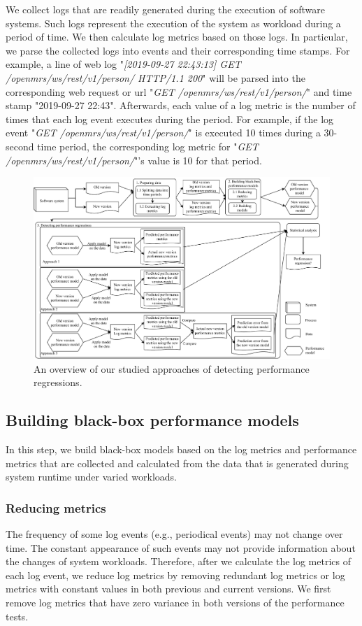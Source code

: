 We collect logs that are readily generated during the execution of software systems. Such logs represent the execution of the system as workload during a period of time. We then calculate log metrics based on those logs. In particular, we parse the collected logs into events and their corresponding time stamps. For example, a line of web log "\emph{[2019-09-27 22:43:13] GET /openmrs/ws/rest/v1/person/ HTTP/1.1 200}" will be parsed into the corresponding web request or url "\emph{GET /openmrs/ws/rest/v1/person/}" and time stamp "2019-09-27 22:43". Afterwards, each value of a log metric is the number of times that each log event executes during the period. For example, if the log event "\emph{GET /openmrs/ws/rest/v1/person/}" is executed 10 times during a 30-second time period, the corresponding log metric for "\emph{GET /openmrs/ws/rest/v1/person/}"’s value is 10 for that period. 


\begin{figure}[tbh]
  \centering
  \includegraphics[width=\textwidth]{overview.pdf}
  \caption{An overview of our studied approaches of detecting performance regressions.}
  \label{fig:overview}
\end{figure}



\subsection{Building black-box performance models}
\label{sec:buildmodel}
In this step, we build black-box models based on the log metrics and performance metrics that are collected and calculated from the data that is generated during system runtime under varied workloads. 

\subsubsection{Reducing metrics}
The frequency of some log events (e.g., periodical events) may not change over time.
The constant appearance of such events may not provide information about the changes of system workloads.
Therefore, after we calculate the log metrics of each log event, we reduce log metrics by removing redundant log metrics or log metrics with constant values in both previous and current versions. We first remove log metrics that have zero variance in both versions of the performance tests. 

